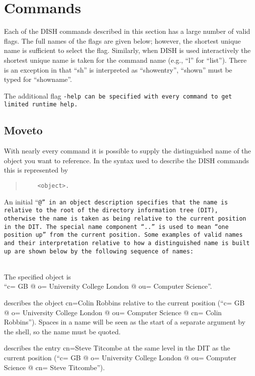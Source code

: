\section {Commands}
\label{dish_commands}

Each of the DISH commands described in this section
has a large number of valid flags.
The full names of the flags are given below; however, the shortest unique
name is sufficient to select the flag.
Similarly, when DISH is used interactively the shortest unique name is taken
for the command name (e.g., ``l'' for ``list'').
There is an exception in that ``sh'' is interpreted as ``showentry'', 
``shown'' must be typed for ``showname''.

The additional flag \tt -help\rm \ can be specified with 
every command to get limited runtime help.

\subsection{Moveto}
\label{dish_start}
With nearly every command it is possible to supply the distinguished name of
the object you want to reference.
In the syntax used to describe the DISH commands this is represented by 
\begin{quote}\begin{verbatim}
	<object>.  
\end{verbatim}\end{quote}
An initial ``\tt @\rm '' in an object description specifies that the name
is relative to the root of the directory information tree (DIT), 
otherwise the name is taken as being relative to the current
position in the DIT.  
The special name component ``..'' is used to mean ``one
position up'' from the current position.  
Some examples of valid names and their interpretation relative to
how a distinguished name is built up are shown below by the following
sequence of names:

\begin{describe}

\item [\verb+@c=GB@o=University College London@ou=Computer Science+:]
\ \\
The specified object is \\
``c= GB @ o= University College London @ ou= Computer Science''.

\item [\verb+cn=Colin Robbins+:]
describes the object
cn=Colin Robbins relative to the current 
position (``c= GB @ o= University College London @ ou= Computer Science @ cn= Colin Robbins''). 
Spaces in a name will be seen as the start of a separate 
argument by the shell, so the name must be quoted.

\item [\verb+..@cn=Steve Titcombe+:]
describes the entry 
cn=Steve Titcombe at the same level
in the DIT as the current position (``c= GB @ o= University College London @
ou= Computer Science @ cn= Steve Titcombe'').

\end{describe}


